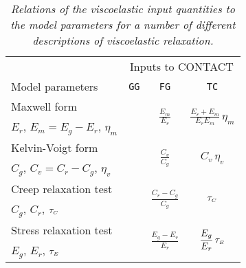 \documentclass[12pt]{report}
\begin{document}
\begin{table}[bt]
\centering
\begin{tabular}{|p{50mm}|c|c|c|}
  \hline
                   & \multicolumn{3}{|c|}{Inputs to CONTACT} \\
  Model parameters & {\tt GG} & {\tt FG} & {\tt TC} \\ \hline
  Maxwell form & \rule{0pt}{12pt}\multirow{2}{*}{$\displaystyle \frac{E_r+E_m}{2(1+\nu)}$} &
                 \multirow{2}{*}{$\displaystyle \frac{E_m}{E_r}$} &
                 \multirow{2}{*}{$\displaystyle \frac{E_r+E_m}{E_r E_m} \,\eta_m$}  \\
  $E_r$, $E_m=E_g-E_r$, $\eta_m$ & & & \\ \hline

  Kelvin-Voigt form & \rule{0pt}{12pt}\multirow{2}{*}{$\displaystyle \frac{1}{C_g}\frac{1}{2(1+\nu)}$} &
               \multirow{2}{*}{$\displaystyle \frac{C_v}{C_g}$} &
               \multirow{2}{*}{$\displaystyle C_v \,\eta_v$}  \\
  $C_g$, $C_v=C_r-C_g$, $\eta_v$ & & & \\ \hline

  Creep relaxation test & \rule{0pt}{12pt}\multirow{2}{*}{$\displaystyle \frac{1}{C_g} \frac{1}{2(1+\nu)}$} &
                 \multirow{2}{*}{$\displaystyle \frac{C_r-C_g}{C_g}$} &
                 \multirow{2}{*}{$\displaystyle \tau_{\scriptscriptstyle C}$}  \\
  $C_g$, $C_r$, $\tau_{\scriptscriptstyle C}$ & & & \\ \hline

  Stress relaxation test & \rule{0pt}{12pt}\multirow{2}{*}{$\displaystyle
\frac{E_g}{2(1+\nu)}$} &
                 \multirow{2}{*}{$\displaystyle \frac{E_g-E_r}{E_r}$} &
                 \multirow{2}{*}{$\displaystyle \frac{E_g}{E_r} \,\tau_{\scriptscriptstyle E}$}  \\
  $E_g$, $E_r$, $\tau_{\scriptscriptstyle E}$ & & & \\ \hline
\end{tabular}
\caption{\em Relations of the viscoelastic input quantities to the model
        parameters for a number of different descriptions of viscoelastic
        relaxation.}
\label{tbl:visc_inputs}
\end{table}

\end{document}
